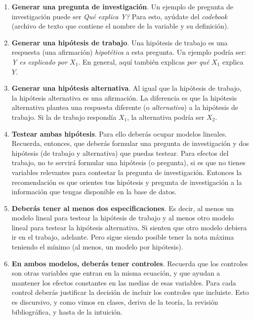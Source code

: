 \documentclass[10pt]{article}
\begin{document}
\begin{enumerate}
	\item {\bf Generar una pregunta de investigaci\'on}. Un ejemplo de pregunta de investigaci\'on puede ser \emph{Qu\'e explica Y?} Para esto, ay\'udate del \emph{codebook} (archivo de texto que contiene el nombre de la variable y su definici\'on).
	
	\item {\bf Generar una hip\'otesis de trabajo}. Una hip\'otesis de trabajo es una respuesta (una afirmaci\'on) \emph{hipot\'etica} a esta pregunta. Un ejemplo podr\'ia ser: \emph{Y es explicado por $X_{1}$}. En general, aqu\'i tambi\'en explicas \emph{por qu\'e} $X_{1}$ explica $Y$.
	
	\item  {\bf Generar una hip\'otesis alternativa}. Al igual que la hip\'otesis de trabajo, la hip\'otesis alternativa es una afirmaci\'on. La diferencia es que la hip\'otesis alternativa plantea una respuesta diferente (o \emph{alternativa}) a la hip\'otesis de trabajo. Si la de trabajo respond\'ia $X_{1}$, la alternativa podr\'ia ser $X_{2}$.
	
	\item {\bf Testear ambas hip\'otesis}. Para ello deber\'as ocupar modelos lineales. Recuerda, entonces, que deber\'as formular una pregunta de investigaci\'on y dos hip\'otesis (de trabajo y alternativa) que puedas testear. Para efectos del trabajo, no te servir\'a formular una hip\'otesis (o pregunta), si es que no tienes variables relevantes para contestar la pregunta de investigaci\'on. Entonces la recomendaci\'on es que orientes tus hip\'otesis y pregunta de investigaci\'on a la informaci\'on que tengas disponible en la base de datos.

	\item {\bf Deber\'as tener al menos dos especificaciones}. Es decir, al menos un modelo lineal para testear la hip\'otesis de trabajo y al menos otro modelo lineal para testear la hip\'otesis alternativa. Si sienten que otro modelo debiera ir en el trabajo, adelante. Pero sigue siendo posible tener la nota m\'axima teniendo el m\'inimo (al menos, un modelo por hip\'otesis). %

	\item {\bf En ambos modelos, deber\'as tener controles}. Recuerda que los controles son otras variables que entran en la misma ecuaci\'on, y que ayudan a mantener los efectos constantes en las medias de esas variables. Para cada control deber\'as justificar la decisi\'on de incluir los controles que incluiste. Esto es discursivo, y como vimos en clases, deriva de la teor\'ia, la revisi\'on bibliogr\'afica, y hasta de la intuici\'on. 


\end{enumerate}
\end{document}
